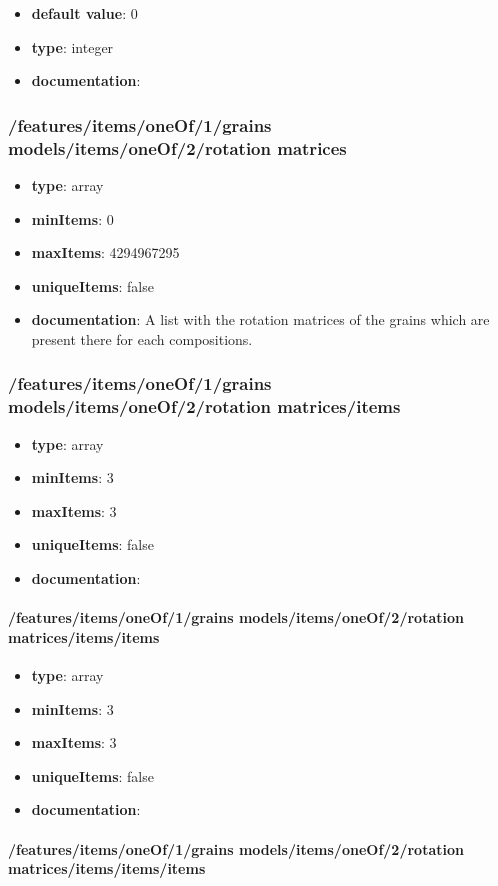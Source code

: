 \begin{itemize}\item {\bf default value}: 0
\item {\bf type}: integer
\item {\bf documentation}: 
\end{itemize}\subsubsection{/features/items/oneOf/1/grains models/items/oneOf/2/rotation matrices}
\begin{itemize}\item {\bf type}: array
\item {\bf minItems}: 0
\item {\bf maxItems}: 4294967295
\item {\bf uniqueItems}: false
\item {\bf documentation}: A list with the rotation matrices of the grains which are present there for each compositions.
\end{itemize}\subsubsection{/features/items/oneOf/1/grains models/items/oneOf/2/rotation matrices/items}
\begin{itemize}\item {\bf type}: array
\item {\bf minItems}: 3
\item {\bf maxItems}: 3
\item {\bf uniqueItems}: false
\item {\bf documentation}: 
\end{itemize}\paragraph{/features/items/oneOf/1/grains models/items/oneOf/2/rotation matrices/items/items}
\begin{itemize}\item {\bf type}: array
\item {\bf minItems}: 3
\item {\bf maxItems}: 3
\item {\bf uniqueItems}: false
\item {\bf documentation}: 
\end{itemize}\paragraph{/features/items/oneOf/1/grains models/items/oneOf/2/rotation matrices/items/items/items}
